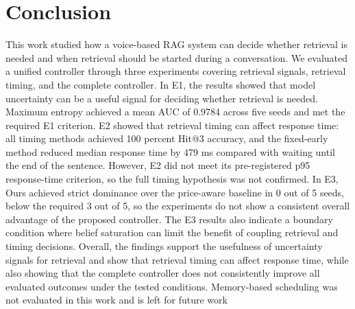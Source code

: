 \section{Conclusion}
%
%
This work studied how a voice-based RAG system can decide whether retrieval is needed and when retrieval should be started during a conversation. We evaluated a unified controller through three experiments covering retrieval signals, retrieval timing, and the complete controller. In E1, the results showed that model uncertainty can be a useful signal for deciding whether retrieval is needed. Maximum entropy achieved a mean AUC of 0.9784 across five seeds and met the required E1 criterion. E2 showed that retrieval timing can affect response time: all timing methods achieved 100 percent Hit@3 accuracy, and the fixed-early method reduced median response time by 479 ms compared with waiting until the end of the sentence. However, E2 did not meet its pre-registered p95 response-time criterion, so the full timing hypothesis was not confirmed. In E3, Ours achieved strict dominance over the price-aware baseline in 0 out of 5 seeds, below the required 3 out of 5, so the experiments do not show a consistent overall advantage of the proposed controller. The E3 results also indicate a boundary condition where belief saturation can limit the benefit of coupling retrieval and timing decisions. Overall, the findings support the usefulness of uncertainty signals for retrieval and show that retrieval timing can affect response time, while also showing that the complete controller does not consistently improve all evaluated outcomes under the tested conditions. Memory-based scheduling was not evaluated in this work and is left for future work